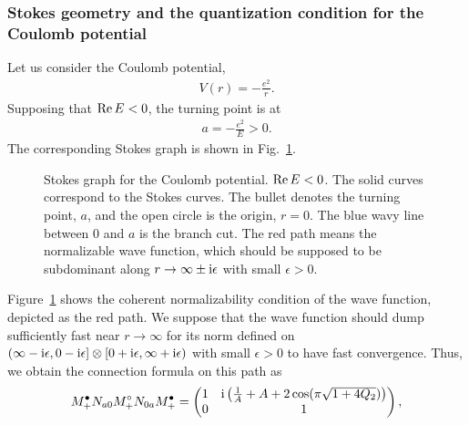\subsubsection{Stokes geometry and the quantization condition for the Coulomb potential}
Let us consider the Coulomb potential,
\begin{align}
    V(r) = - \frac{e^2}{r} .
\end{align}
Supposing that $\operatorname{Re} E<0$, the turning point is at
\begin{align}
    a = - \frac{e^2}{E} > 0.
\end{align}
The corresponding Stokes graph is shown in Fig.~\ref{src:2510_11766:fig:stokes_coulomb}.
\begin{figure}[t]
\centering
{}
\caption{Stokes graph for the Coulomb potential. $\operatorname{Re} E<0$. The solid curves correspond to the Stokes curves. The bullet denotes the turning point, $a$, and the open circle is the origin, $r=0$. The blue wavy line between $0$ and $a$ is the branch cut. The red path means the normalizable wave function, which should be supposed to be subdominant along $r\to\infty\pm \mathrm{i}\epsilon$ with small $\epsilon>0$.}
\label{src:2510_11766:fig:stokes_coulomb}
\end{figure}
Figure~\ref{src:2510_11766:fig:stokes_coulomb} shows the coherent normalizability condition of the wave function, depicted as the red path. We suppose that the wave function should dump sufficiently fast near $r\to\infty$ for its norm defined on $(\infty-\mathrm{i}\epsilon,0-\mathrm{i}\epsilon]\otimes[0+\mathrm{i}\epsilon,\infty+\mathrm{i}\epsilon)$ with small $\epsilon>0$ to have fast convergence. Thus, we obtain the connection formula on this path as
\begin{align}
    M_{+}^\bullet N_{a0} M_{+}^\circ N_{0a} M_{+}^\bullet =
    \begin{pmatrix}
        1 & \mathrm{i}\left(\frac{1}{A} + A + 2\cos(\pi\sqrt{1+4Q_2})\right) \\
        0 & 1
    \end{pmatrix} ,
\end{align}
